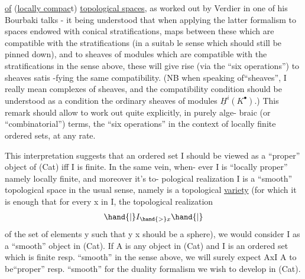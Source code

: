 
\uline{of} (\uline{locally compac}t) \uline{topological spaces}, as worked out by Verdier in one
of his Bourbaki talks - it being understood that when applying the
latter formalism to spaces endowed with conical stratifications, maps
between these which are compatible with the stratifications (in a suitab%
le sense which should still be pinned down), and to sheaves of modules
which  are compatible with the stratifications in the sense
above, these will give rise (via the ``six operations'') to sheaves satis
-fying the same compatibility. (NB when speaking of``sheaves'', I really
mean complexes of sheaves, and the compatibility condition should be
understood as a condition  the ordinary sheaves of modules $\underline{H}^i(K^\bullet)$.)
This remark should allow to work out quite explicitly, in purely alge-%
braic (or ``combinatorial'') terms, the ``six operations'' in the context
of locally finite ordered sets, at any rate.

This interpretation suggests that an ordered set I should be viewed
as a ``proper'' object of (Cat) iff I is finite. In the same vein, when-%
ever I is ``locally proper'' namely locally finite, and moreover it's to-%
pological realization I is a ``smooth'' topological space in the usual
sense, namely is a topological \uline{variety} (for which it is enough that
for every x in I, the topological realization
\[ \hand{|}I_{\hand{>}x}\hand{|} \]
of the set of elements y such that y \hand{$>$} x should be a sphere), we would
consider I as a ``smooth'' object in (Cat). If A is any object in (Cat)
and I is an ordered set which is finite resp. ``smooth'' in the sense
above, we will surely expect AxI \hand{$\longrightarrow$} A to be``proper'' resp. ``smooth''
for the duality formalism we wish to develop in (Cat).

